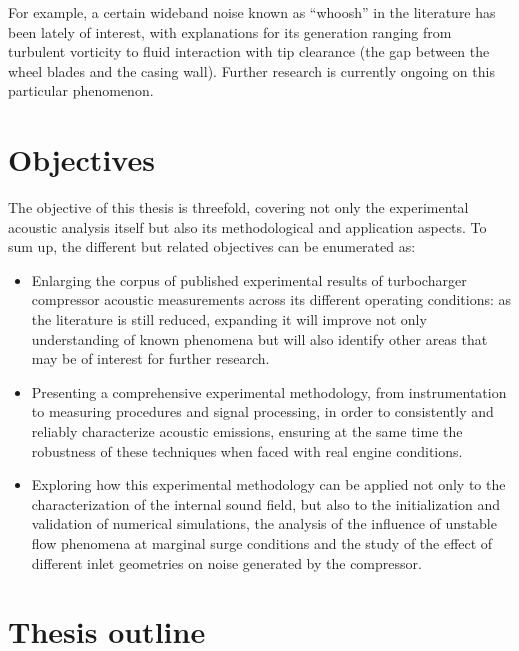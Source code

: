 For example, a certain wideband noise known as ``whoosh'' in the literature has been lately of interest, with explanations for its generation ranging from turbulent vorticity to fluid interaction with tip clearance (the gap between the wheel blades and the casing wall). Further research is currently ongoing on this particular phenomenon.


\section{Objectives}

The objective of this thesis is threefold, covering not only the experimental acoustic analysis itself but also its methodological and application aspects. To sum up, the different but related objectives can be enumerated as:

\begin{itemize}
	\item Enlarging the corpus of published experimental results of turbocharger compressor acoustic measurements across its different operating conditions: as the literature is still reduced, expanding it will improve not only understanding of known phenomena but will also identify other areas that may be of interest for further research.

	\item Presenting a comprehensive experimental methodology, from instrumentation to measuring procedures and signal processing, in order to consistently and reliably characterize acoustic emissions, ensuring at the same time the robustness of these techniques when faced with real engine conditions.

	\item Exploring how this experimental methodology can be applied not only to the characterization of the internal sound field, but also to the initialization and validation of numerical simulations, the analysis of the influence of unstable flow phenomena at marginal surge conditions and the study of the effect of different inlet geometries on noise generated by the compressor.
\end{itemize}

\section{Thesis outline}

